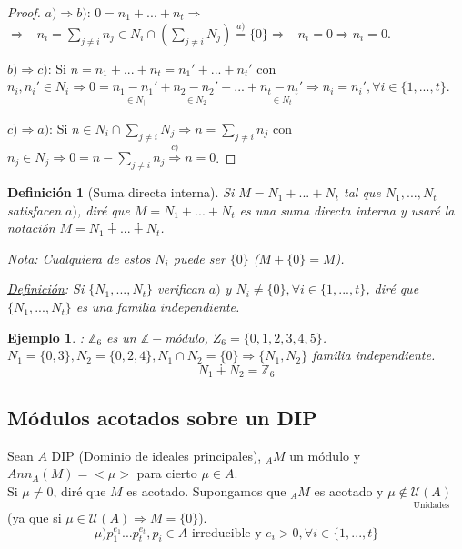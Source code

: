 \documentclass[11pt,a4paper]{article}
\theoremstyle{break}
\newtheorem{example}[theorem]{Ejemplo}
\newtheorem{definition}[theorem]{Definición}
\begin{document}
\begin{proof}
\underline{$a) \Rightarrow b)$}: $0 = n_{1} + ... + n_{t} \Rightarrow$ \\ $\Rightarrow -n_{i} = \sum_{j \neq i} n_{j} \in N_{i} \cap (\sum_{j \neq i} N_{j}) \overset{a)}{=} \{0\} \Rightarrow -n_{i} = 0 \Rightarrow n_{i} = 0$.
 
\underline{$b) \Rightarrow c)$}: Si $n = n_{1} + ... + n_{t} = n_{1}' + ... + n_{t}'$ con $n_{i}, n_{i}' \in N_{i} \Rightarrow 0 = \underset{\in N_{|}}{n_{1} - n_{1}'} + \underset{\in N_{2}}{n_{2} - n_{2}'} + ... + \underset{\in N_{t}}{n_{t} - n_{t}'} \Rightarrow n_{i} = n_{i}', \forall i \in \{1, ..., t\}$.
 
\underline{$c) \Rightarrow a)$}: Si $n \in N_{i} \cap \sum_{j \neq i} N_{j} \Rightarrow n = \sum_{j \neq i} n_{j}$ con $n_{j} \in N_{j} \Rightarrow 0 = n - \sum_{j \neq i} n_{j} \overset{c)}{\Rightarrow} n = 0$.
\end{proof}
 
\begin{definition}[Suma directa interna]
Si $M = N_{1} + ... + N_{t}$ tal que $N_{1}, ..., N_{t}$ satisfacen $a)$, diré que $M = N_{1} + ... + N_{t}$ es una suma directa interna y usaré la notación $M = N_{1} \dotplus ... \dotplus N_{t}$.

\underline{Nota}: Cualquiera de estos $N_{i}$ puede ser $\{0\}$ ($M + \{0\} = M$).

\underline{Definición}: Si $\{N_{1}, ..., N_{t}\}$ verifican $a)$ y $N_{i} \neq \{0\}, \forall i \in \{1, ..., t\}$, diré que $\{N_{1}, ..., N_{t}\}$ es una familia independiente.
\end{definition}

\begin{example}:
$\mathbb{Z}_{6}$ es un $\mathbb{Z}-$módulo, $Z_{6} = \{0, 1, 2, 3, 4, 5\}$. \\
$N_{1} = \{0, 3\}, N_{2} = \{0, 2, 4\}, N_{1} \cap N_{2} = \{0\} \Rightarrow \{N_{1}, N_{2}\}$ familia independiente.
$$N_{1} \dotplus N_{2} = \mathbb{Z}_{6}$$
\end{example}

\subsection*{Módulos acotados sobre un DIP}
Sean $A$ DIP (Dominio de ideales principales), $_{A}M$ un módulo y \\ $Ann_{A}(M) = <\mu>$ para cierto $\mu \in A$. \\
Si $\mu \neq 0$, diré que $M$ es acotado. Supongamos que $_{A}M$ es acotado y $\mu \notin \underset{\text{Unidades}}{\mathcal{U}(A)}$ (ya que si $\mu \in \mathcal{U}(A) \Rightarrow M = \{0\}$).
$$\mu ) p_{1}^{e_{1}} ... p_{t}^{e_{t}}, p_{i} \in A \text{ irreducible y } e_{i} > 0, \forall i \in \{1, ..., t\}$$
\end{document}
